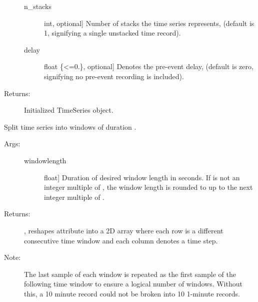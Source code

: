 \documentclass[letterpaper,10pt,english]{sphinxmanual}
\begin{document}
\begin{fulllineitems}
\begin{fulllineitems}
\begin{description}
\begin{description}
\item[{n\_stacks}] \leavevmode{[}int, optional{]}
Number of stacks the time series represents, (default is
1, signifying a single unstacked time record).

\item[{delay}] \leavevmode{[}float \{\textless{}=0.\}, optional{]}
Denotes the pre-event delay, (default is zero, 
signifying no pre-event recording is included).

\end{description}

\item[{Returns:}] \leavevmode
Initialized TimeSeries object.

\end{description}

\end{fulllineitems}


\begin{fulllineitems}
\label{\detokenize{index:sigpropy.TimeSeries.split}}
Split time series into windows of duration .
\begin{description}
\item[{Args:}] \leavevmode\begin{description}
\item[{windowlength}] \leavevmode{[}float{]}
Duration of desired window length in seconds. If 
 is not an integer multiple of , the 
window length is rounded to up to the next integer
multiple of .

\end{description}

\item[{Returns:}] \leavevmode
{}, reshapes attribute  into a 2D array 
where each row is a different consecutive time window and 
each column denotes a time step.

\item[{Note:}] \leavevmode
The last sample of each window is repeated as the first
sample of the following time window to ensure a logical
number of windows. Without this, a 10 minute record could
not be broken into 10 1-minute records.


\end{description}
\end{fulllineitems}
\end{fulllineitems}
\end{document}
